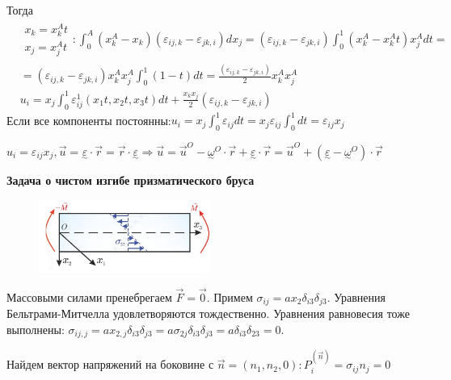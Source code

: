 Тогда   
$$
\begin{aligned}
& \begin{array}{l}
x_k=x_k^A t \\
x_j=x_j^A t
\end{array}: \int_0^A\left(x_k^A-x_k\right)\left(\varepsilon_{i j, k}-\varepsilon_{j k, i}\right) d x_j=\left(\varepsilon_{i j, k}-\varepsilon_{j k, i}\right) \int_0^1\left(x_k^A-x_k^A t\right) x_j^A d t= \\
& =\left(\varepsilon_{i j, k}-\varepsilon_{j k, i}\right) x_k^A x_j^A \int_0^1(1-t) d t=\frac{\left(\varepsilon_{i j, k}-\varepsilon_{j k, i}\right)}{2} x_k^A x_j^A \\
& u_i=x_j \int_0^1 \varepsilon_{i j}^1\left(x_1 t, x_2 t, x_3 t\right) d t+\frac{x_k x_j}{2}\left(\varepsilon_{i j, k}-\varepsilon_{j k, i}\right)
\end{aligned}
$$
Если все компоненты постоянны:$\displaystyle u_i=x_j \int_0^1 \varepsilon_{i j} d t =  x_j \varepsilon_{i j} \int_0^1 d t=\varepsilon_{i j} x_j$


$\displaystyle
u_i=\varepsilon_{i j} x_j, \vec{u}=\underset{\sim}{\varepsilon} \cdot \vec{r}=\vec{r} \cdot \underset{\sim}{\varepsilon} \Rightarrow
\vec{u}=\vec{u}^O-{\underset{\sim}{\omega}}^O \cdot \vec{r}+\underset{\sim}{\varepsilon} \cdot \vec{r}=\vec{u}^O+\left(\underset{\sim}{\varepsilon}-{\underset{\sim}{\omega}}^O\right) \cdot \vec{r}
$



\textbf{Задача о чистом изгибе призматического бруса}

\begin{figure}[h!]
  \centering
  \includegraphics[width=0.5\textwidth]{images/17.1.jpg}  
\end{figure}



Массовыми силами пренебрегаем $\vec{F}=\vec{0}$.
Примем $\sigma_{ij}=ax_2\delta_{i3}\delta_{j3}$.  Уравнения Бельтрами-Митчелла удовлетворяются тождественно. Уравнения
равновесия тоже выполнены: $\sigma_{ij,j}=ax_{2,j}\delta_{i3}\delta_{j3}=a\sigma_{2j}\delta_{i3}\delta_{j3}=a\delta_{i3}\delta_{23}=0$.


Найдем вектор напряжений на боковине с $\vec{n}=(n_1, n_2, 0): P_i^{(\vec{n})}=\sigma_{ij}n_j=0$ 


